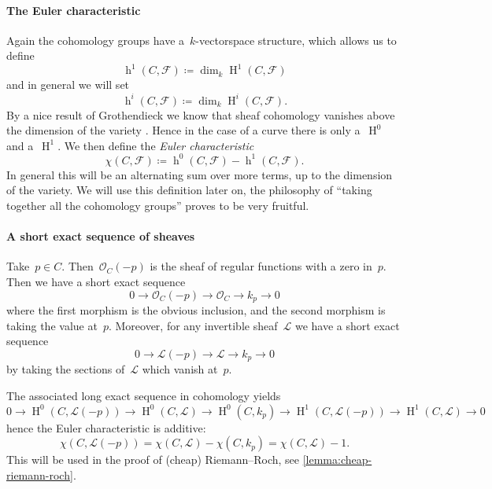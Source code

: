 \documentclass[10pt,a4paper]{article}
\theoremstyle{lecture}
\newcommand\dash{\nobreakdash-\hspace{0pt}}
\DeclareMathOperator\hh{h}
\DeclareMathOperator\HH{H}
\begin{document}
\paragraph{The Euler characteristic}
Again the cohomology groups have a~$k$\dash vectorspace structure, which allows us to define
\begin{equation}
  \hh^1(C,\mathcal{F})\coloneqq\dim_k\HH^1(C,\mathcal{F})
\end{equation}
and in general we will set
\begin{equation}
  \hh^i(C,\mathcal{F})\coloneqq\dim_k\HH^i(C,\mathcal{F}).
\end{equation}
By a nice result of Grothendieck we know that sheaf cohomology vanishes above the dimension of the variety \cite[theorem III.2.7]{hartshorne-algebraic-geometry}. Hence in the case of a curve there is only a~$\HH^0$ and a~$\HH^1$. We then define the \emph{Euler characteristic}
\begin{equation}
  \chi(C,\mathcal{F})\coloneqq\hh^0(C,\mathcal{F})-\hh^1(C,\mathcal{F}).
\end{equation}
In general this will be an alternating sum over more terms, up to the dimension of the variety. We will use this definition later on, the philosophy of ``taking together all the cohomology groups'' proves to be very fruitful.

\paragraph{A short exact sequence of sheaves}
Take~$p\in C$. Then~$\mathcal{O}_C(-p)$ is the sheaf of regular functions with a zero in~$p$. Then we have a short exact sequence
\begin{equation}
  0\to\mathcal{O}_C(-p)\to\mathcal{O}_C\to k_p\to 0
\end{equation}
where the first morphism is the obvious inclusion, and the second morphism is taking the value at~$p$. Moreover, for any invertible sheaf~$\mathcal{L}$ we have a short exact sequence
\begin{equation}
  0\to\mathcal{L}(-p)\to\mathcal{L}\to k_p\to 0
\end{equation}
by taking the sections of~$\mathcal{L}$ which vanish at~$p$.

The associated long exact sequence in cohomology yields
\begin{equation}
  0\to\HH^0(C,\mathcal{L}(-p))\to\HH^0(C,\mathcal{L})\to\HH^0(C,k_p)\to\HH^1(C,\mathcal{L}(-p))\to\HH^1(C,\mathcal{L})\to 0
\end{equation}
hence the Euler characteristic is additive:
\begin{equation}
  \chi(C,\mathcal{L}(-p))=\chi(C,\mathcal{L})-\chi(C,k_p)=\chi(C,\mathcal{L})-1.
\end{equation}
This will be used in the proof of (cheap) Riemann--Roch, see \cref{lemma:cheap-riemann-roch}.
\end{document}
